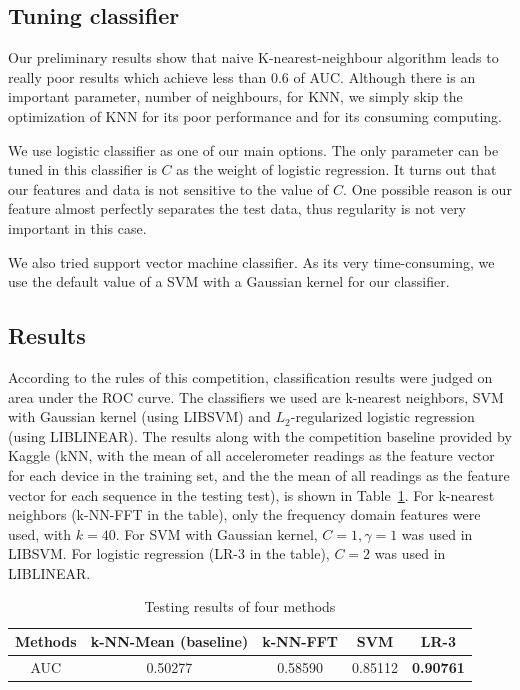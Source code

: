 \documentclass{article} %
\begin{document}
\subsection{Tuning classifier}
Our preliminary results show that naive K-nearest-neighbour algorithm leads to really poor results which achieve less than 0.6 of AUC. Although there is an important parameter, number of neighbours, for KNN, we simply skip the optimization of KNN for its poor performance and for its consuming computing. 

We use logistic classifier as one of our main options. The only parameter can be tuned in this classifier is $C$ as the weight of logistic regression. It turns out that our features and data is not sensitive to the value of $C$. One possible reason is our feature almost perfectly separates the test data, thus regularity is not very important in this case.

We also tried support vector machine classifier. As its very time-consuming, we use the default value of a SVM with a Gaussian kernel for our classifier.


\subsection{Results}


According to the rules of this competition, classification results were judged on area under the ROC curve. The classifiers we used are k-nearest neighbors, SVM with Gaussian kernel (using LIBSVM) and $L_2$-regularized logistic regression (using LIBLINEAR). The results along with the competition baseline provided by Kaggle (kNN, with the mean of all accelerometer readings as the feature vector for each device in the training set, and the the mean of all readings as the feature vector for each sequence in the testing test), is shown in Table~\ref{tbl:test_result}. For k-nearest neighbors (k-NN-FFT in the table), only the frequency domain features were used, with $k=40$. For SVM with Gaussian kernel, $C=1, \gamma=1$ was used in LIBSVM. For logistic regression (LR-3 in the table), $C=2$ was used in LIBLINEAR.


\begin{table}[!ht]
\caption{Testing results of four methods}
\label{tbl:test_result}
	\begin{center}
		\begin{tabular}{ c | c  c  c  c }
			\hline
			 Methods & k-NN-Mean (baseline) & k-NN-FFT & SVM & LR-3 \\
			 \hline
			 AUC & 0.50277 & 0.58590 & 0.85112 & \textbf{0.90761} \\
			 \hline
		\end{tabular}
	\end{center}
\end{table}
\end{document}
